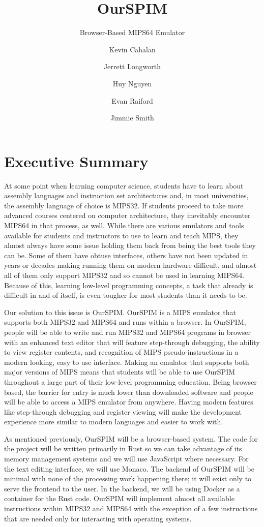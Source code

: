 \documentclass[parskip=half, fontsize=12pt]{scrartcl}
\title{OurSPIM}
\subtitle{Browser-Based MIPS64 Emulator}
\author{
    Kevin Cahalan
    \and
    Jerrett Longworth
    \and
    Huy Nguyen
    \and
    Evan Raiford
    \and
    Jimmie Smith
}
\begin{document}
\renewcommand*{\titlepagestyle}{empty}
\maketitle
\clearpage

\setcounter{page}{1}
\tableofcontents
\clearpage

\setcounter{page}{1}
\section{Executive Summary}

At some point when learning computer science, students have to learn about assembly languages and instruction set architectures and, in most universities, the assembly language of choice is MIPS32. If students proceed to take more advanced courses centered on computer architecture, they inevitably encounter MIPS64 in that process, as well. While there are various emulators and tools available for students and instructors to use to learn and teach MIPS, they almost always have some issue holding them back from being the best tools they can be. Some of them have obtuse interfaces, others have not been updated in years or decades making running them on modern hardware difficult, and almost all of them only support MIPS32 and so cannot be used in learning MIPS64. Because of this, learning low-level programming concepts, a task that already is difficult in and of itself, is even tougher for most students than it needs to be.

Our solution to this issue is OurSPIM. OurSPIM is a MIPS emulator that supports both MIPS32 and MIPS64 and runs within a browser. In OurSPIM, people will be able to write and run MIPS32 and MIPS64 programs in browser with an enhanced text editor that will feature step-through debugging, the ability to view register contents, and recognition of MIPS pseudo-instructions in a modern looking, easy to use interface. Making an emulator that supports both major versions of MIPS means that students will be able to use OurSPIM throughout a large part of their low-level programming education. Being browser based, the barrier for entry is much lower than downloaded software and people will be able to access a MIPS emulator from anywhere. Having modern features like step-through debugging and register viewing will make the development experience more similar to modern languages and easier to work with.

As mentioned previously, OurSPIM will be a browser-based system. The code for the project will be written primarily in Rust so we can take advantage of its memory management systems and we will use JavaScript where necessary. For the text editing interface, we will use Monaco. The backend of OurSPIM will be minimal with none of the processing work happening there; it will exist only to serve the frontend to the user. In the backend, we will be using Docker as a container for the Rust code. OurSPIM will implement almost all available instructions within MIPS32 and MIPS64 with the exception of a few instructions that are needed only for interacting with operating systems.
\end{document}
